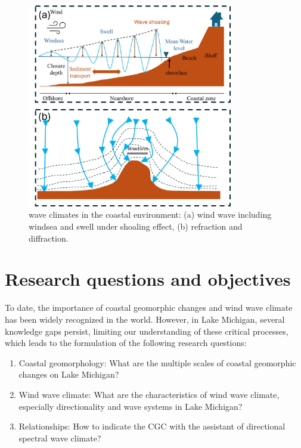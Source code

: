 \begin{figure}[htbp]
  \centering
  \includegraphics[width=0.8\textwidth]{chapter1/resources/figure1-5.jpg}
  \caption{wave climates in the coastal environment: (a) wind wave including windsea and swell under shoaling effect, (b) refraction and diffraction.}
  \label{fig:fig1.5}
\end{figure}


\section{Research questions and objectives}

To date, the importance of coastal geomorphic changes and wind wave climate has
been widely recognized in the world. However, in Lake Michigan, several
knowledge gaps persist, limiting our understanding of these critical processes,
which leads to the formulation of the following research questions:

\begin{enumerate}
    \item Coastal geomorphology: What are the multiple scales of coastal geomorphic changes on Lake Michigan?
    \item Wind wave climate: What are the characteristics of wind wave climate, especially directionality and wave systems in Lake Michigan?
    \item Relationships: How to indicate the CGC with the assistant of directional spectral wave climate?
\end{enumerate}

